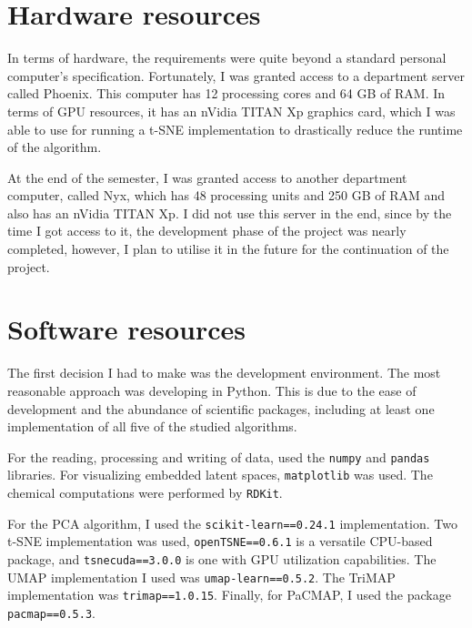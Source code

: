 \section{Hardware resources}\label{sec:hardware-resources}

In terms of hardware, the requirements were quite beyond a standard personal computer's specification. Fortunately, I was granted access to a department server called Phoenix. This computer has 12 processing cores and 64 GB of RAM. In terms of GPU resources, it has an nVidia TITAN Xp graphics card, which I was able to use for running a t-SNE implementation to drastically reduce the runtime of the algorithm.

At the end of the semester, I was granted access to another department computer, called Nyx, which has 48 processing units and 250 GB of RAM and also has an nVidia TITAN Xp. I did not use this server in the end, since by the time I got access to it, the development phase of the project was nearly completed, however, I plan to utilise it in the future for the continuation of the project.

\section{Software resources}\label{sec:software-resources}

The first decision I had to make was the development environment. The most reasonable approach was developing in Python. This is due to the ease of development and the abundance of scientific packages, including at least one implementation of all five of the studied algorithms. 

For the reading, processing and writing of data, used the \texttt{numpy} and \texttt{pandas} libraries. For visualizing embedded latent spaces, \texttt{matplotlib} was used. The chemical computations were performed by \texttt{RDKit}\cite{bib:rdkit}.

For the PCA algorithm, I used the \texttt{scikit-learn==0.24.1} implementation. Two t-SNE implementation was used, \texttt{openTSNE==0.6.1} is a versatile CPU-based package, and \texttt{tsnecuda==3.0.0} is one with GPU utilization capabilities. The UMAP implementation I used was \texttt{umap-learn==0.5.2}. The TriMAP implementation was \texttt{trimap==1.0.15}. Finally, for PaCMAP, I used the package \texttt{pacmap==0.5.3}.